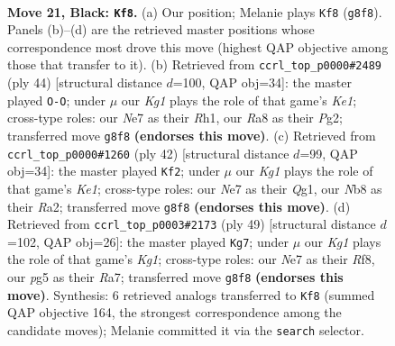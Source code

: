 \documentclass[11pt]{article}
\begin{document}
\clearpage

\begin{figure}[p]\centering
\begin{subfigure}{0.46\textwidth}\centering
\resizebox{\linewidth}{!}{%
\newchessgame
\chessboard[
  setfen={rnb1r1k1/1p2np1p/4p3/p1P1P1P1/P4P2/7Q/2q1B3/R1B1K1NR b KQ - 2 21},
  showmover=false,
  pgfstyle=straightmove, color=movearrow, markmove={g8-f8}
]}
\caption{}
\end{subfigure}\hfill
\begin{subfigure}{0.46\textwidth}\centering
\resizebox{\linewidth}{!}{%
\newchessgame
\chessboard[
  setfen={1r1q1r1k/3b1p1p/3p2pb/1P1Qp3/RN2P2P/8/4BPP1/4K2R w K - 0 23},
  showmover=false,
  pgfstyle=straightmove, color=movearrow, markmove={e1-g1}
]}
\caption{}
\end{subfigure}
\\[4pt]
\begin{subfigure}{0.46\textwidth}\centering
\resizebox{\linewidth}{!}{%
\newchessgame
\chessboard[
  setfen={1k1rqb1r/1pp3pb/5p2/n2p3P/3P1P1R/P1N1P3/R3B3/2B1K1Q1 w - - 0 22},
  showmover=false,
  pgfstyle=straightmove, color=movearrow, markmove={e1-f2}
]}
\caption{}
\end{subfigure}\hfill
\begin{subfigure}{0.46\textwidth}\centering
\resizebox{\linewidth}{!}{%
\newchessgame
\chessboard[
  setfen={5rk1/r2n1p2/3P1bpp/p3p3/1pQ1N2q/4P3/1P3PBP/R2R2K1 b - - 2 25},
  showmover=false,
  pgfstyle=straightmove, color=movearrow, markmove={g8-g7}
]}
\caption{}
\end{subfigure}
\caption{\textbf{Move 21, Black: \texttt{Kf8}.} (a) Our position; Melanie plays \texttt{Kf8} (\texttt{g8f8}). Panels (b)--(d) are the retrieved master positions whose correspondence most drove this move (highest QAP objective among those that transfer to it). (b) Retrieved from \texttt{ccrl\_top\_p0000\#2489} (ply 44) [structural distance $d$=100, QAP obj=34]: the master played \texttt{O-O}; under $\mu$ our \emph{Kg1} plays the role of that game's \emph{Ke1}; cross-type roles: our \emph{N}e7 as their \emph{R}h1, our \emph{R}a8 as their \emph{P}g2; transferred move \texttt{g8f8} \textbf{(endorses this move)}. (c) Retrieved from \texttt{ccrl\_top\_p0000\#1260} (ply 42) [structural distance $d$=99, QAP obj=34]: the master played \texttt{Kf2}; under $\mu$ our \emph{Kg1} plays the role of that game's \emph{Ke1}; cross-type roles: our \emph{N}e7 as their \emph{Q}g1, our \emph{N}b8 as their \emph{R}a2; transferred move \texttt{g8f8} \textbf{(endorses this move)}. (d) Retrieved from \texttt{ccrl\_top\_p0003\#2173} (ply 49) [structural distance $d$=102, QAP obj=26]: the master played \texttt{Kg7}; under $\mu$ our \emph{Kg1} plays the role of that game's \emph{Kg1}; cross-type roles: our \emph{N}e7 as their \emph{R}f8, our \emph{p}g5 as their \emph{R}a7; transferred move \texttt{g8f8} \textbf{(endorses this move)}. Synthesis: 6 retrieved analogs transferred to \texttt{Kf8} (summed QAP objective 164, the strongest correspondence among the candidate moves); Melanie committed it via the \texttt{search} selector.}
\label{fig:thought-m41}
\end{figure}
\end{document}
